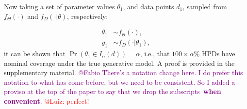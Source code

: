 \documentclass[oneside]{article}
\begin{document}
Now taking a set of parameter values $\theta_1$, and data points $d_1$,
sampled from $f_\Theta(\cdot)$ and $f_D(\cdot|\theta)$, respectively:

\begin{align*}
 \theta_1 &\sim f_\Theta(\cdot),\\
  y_1 & \sim f_D(\cdot | \theta_1),
\end{align*}
\noindent it can be shown that $\operatorname{Pr}\left(\theta_1 \in I_\alpha(d) \right) = \alpha$, i.e., that $100\times\alpha$\% HPDs
have nominal coverage under the true generative model.
A proof is provided in the supplementary material.
\textcolor{purple}{@Fabio There's a notation change here. I do prefer this notation to what has come before, but we need to be consistent. So I added a proviso at the top of the paper to say that we drop the subscripts~\textbf{when convenient}.} \textcolor{red}{@Luiz: perfect!}

%   
\end{document}
